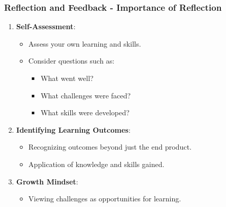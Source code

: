 \documentclass{beamer}
\begin{document}
\begin{frame}[fragile]
    \frametitle{Reflection and Feedback - Importance of Reflection}
    \begin{enumerate}
        \item \textbf{Self-Assessment}:
            \begin{itemize}
                \item Assess your own learning and skills.
                \item Consider questions such as:
                \begin{itemize}
                    \item What went well?
                    \item What challenges were faced?
                    \item What skills were developed?
                \end{itemize}
            \end{itemize}
        
        \item \textbf{Identifying Learning Outcomes}:
            \begin{itemize}
                \item Recognizing outcomes beyond just the end product.
                \item Application of knowledge and skills gained.
            \end{itemize}
        
        \item \textbf{Growth Mindset}:
            \begin{itemize}
                \item Viewing challenges as opportunities for learning.
            \end{itemize}
    \end{enumerate}
\end{frame}
\end{document}
